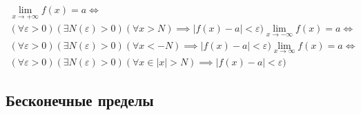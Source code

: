 \begin{note}
 \begin{gather*}
  \lim_{x \to +\infty} f(x) = a \iff \\
  (\forall \varepsilon > 0)(\exists N(\varepsilon) > 0)(\forall x > N) \implies |f(x) - a| < \varepsilon)

  \lim_{x \to -\infty} f(x) = a \iff \\
  (\forall \varepsilon > 0)(\exists N(\varepsilon) > 0)(\forall x < -N) \implies |f(x) - a| < \varepsilon)

  \lim_{x \to \infty} f(x) = a \iff \\
  (\forall \varepsilon > 0)(\exists N(\varepsilon) > 0)(\forall x \in |x| > N) \implies |f(x) - a| < \varepsilon)

\end{gather*} 
\end{note}

\subsection{Бесконечные пределы}


